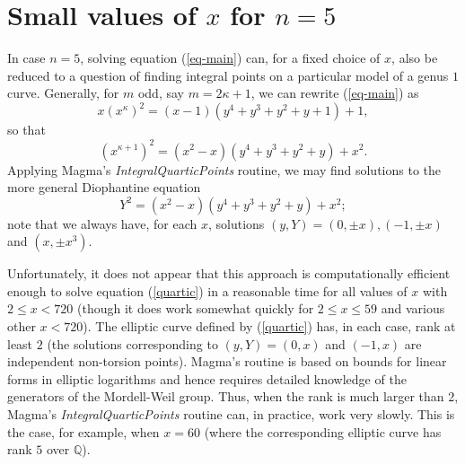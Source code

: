  \section{Small values of $x$ for $n=5$} \label{TM}
 
 In case $n=5$, solving equation (\ref{eq-main}) can, for a fixed choice of $x$, also be reduced to a question of finding integral points on a particular model of a genus $1$ curve.
 Generally, for $m$ odd, say $m= 2 \kappa+1$, we can rewrite  (\ref{eq-main}) as
 $$
 x \left( x^{\kappa} \right)^2 = (x-1) \left( y^4+y^3+y^2+y+1 \right) + 1,
 $$
 so that 
 $$
 \left( x^{\kappa+1} \right)^2 = (x^2-x) \left( y^4+y^3+y^2+y \right) + x^2.
 $$
 Applying Magma's {\it IntegralQuarticPoints} routine, 
 we may find solutions to the more general Diophantine equation
 \begin{equation} \label{quartic}
 Y^2 = (x^2-x) \left( y^4+y^3+y^2+y \right) + x^2;
 \end{equation}
 note that we always have, for each $x$, solutions $(y,Y) = (0, \pm x), (-1, \pm x)$ and $(x, \pm x^3)$. 
 
 Unfortunately, it does not appear that this approach is computationally efficient enough to solve equation (\ref{quartic}) in a reasonable time for all values of $x$ with  $2 \leq x < 720$ (though it does work somewhat quickly for $2 \leq x \leq 59$ and various other $x < 720$). The elliptic curve defined by (\ref{quartic}) has, in each case, rank at least $2$ (the solutions corresponding to $(y,Y) = (0, x)$ and $(-1, x)$ are independent non-torsion points). Magma's  routine is based on bounds for  linear forms in elliptic logarithms and hence requires detailed knowledge of the generators of the Mordell-Weil group. Thus, when the rank is much larger than $2$, Magma's   {\it IntegralQuarticPoints} routine can, in practice, work very slowly. This is the case, for example, when $x=60$ (where the corresponding elliptic curve has rank $5$ over $\mathbb{Q}$).  

 
 

